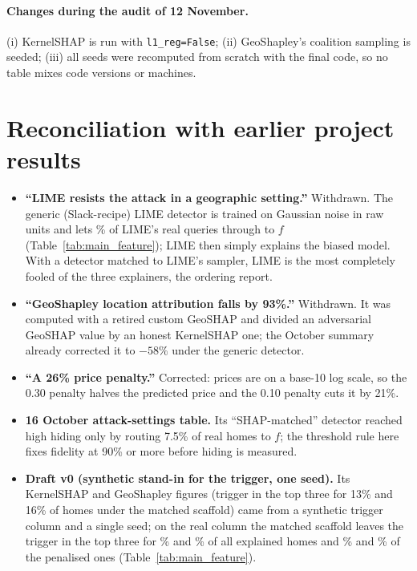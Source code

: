 \paragraph{Changes during the audit of 12 November.} (i) KernelSHAP is run with \texttt{l1\_reg=False}; (ii)
GeoShapley's coalition sampling is seeded; (iii) all seeds were recomputed from scratch with the final code, so no
table mixes code versions or machines.

\section{Reconciliation with earlier project results}
\begin{itemize}
  \item \textbf{``LIME resists the attack in a geographic setting.''} Withdrawn. The generic (Slack-recipe) LIME detector
        is trained on Gaussian noise in raw units and lets \FLIMEGenLeak\% of LIME's real queries through to $f$
        (Table~\ref{tab:main_feature}); LIME then simply explains the biased model. With a detector matched to LIME's
        sampler, LIME is the most completely fooled of the three explainers, the ordering \citet{slack2020fooling}
        report.
  \item \textbf{``GeoShapley location attribution falls by 93\%.''} Withdrawn. It was computed with a retired custom
        GeoSHAP and divided an adversarial GeoSHAP value by an honest KernelSHAP one; the October summary already
        corrected it to $-58\%$ under the generic detector.
  \item \textbf{``A 26\% price penalty.''} Corrected: prices are on a base-10 log scale, so the 0.30 penalty halves the
        predicted price and the 0.10 penalty cuts it by 21\%.
  \item \textbf{16 October attack-settings table.} Its ``SHAP-matched'' detector reached high hiding only by routing
        7.5\% of real homes to $f$; the threshold rule here fixes fidelity at 90\% or more before hiding is measured.
  \item \textbf{Draft v0 (synthetic stand-in for the trigger, one seed).} Its KernelSHAP and GeoShapley figures
        (trigger in the top three for 13\% and 16\% of homes under the matched scaffold) came from a synthetic trigger
        column and a single seed; on the real column the matched scaffold leaves the trigger in the top three for
        \FKernelSHAPMatTop\% and \FGeoShapleyMatTop\% of all explained homes and \FKernelSHAPMatTopPen\% and
        \FGeoShapleyMatTopPen\% of the penalised ones (Table~\ref{tab:main_feature}).
\end{itemize}

